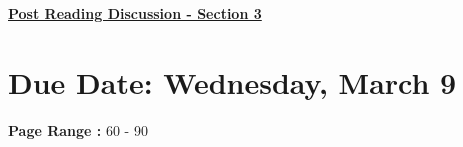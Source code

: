 \documentclass[12pt]{article} %
\begin{document}
	\renewcommand*{\coursecode}{MATH 235} %
	\renewcommand*{\assgnnumber}{Assignment 1} %
	\renewcommand*{\submdate}{September 14, 2021} %
	\renewcommand*{\studentfname}{Abdullah} %
	\renewcommand*{\studentlname}{Zubair} %
    \renewcommand*{\proofname}{Proof:}

	\renewcommand\qedsymbol{$\blacksquare$}
	\setfigpath
	\fancyhfoffset[L,O]{0pt} %




\begin{center}
	\textbf{\underline{\Huge{Post Reading Discussion - Section 3}}}
\end{center}

\section*{Due Date: Wednesday, March 9}
\large{\textbf{Page Range :} 60 - 90}
\end{document}
